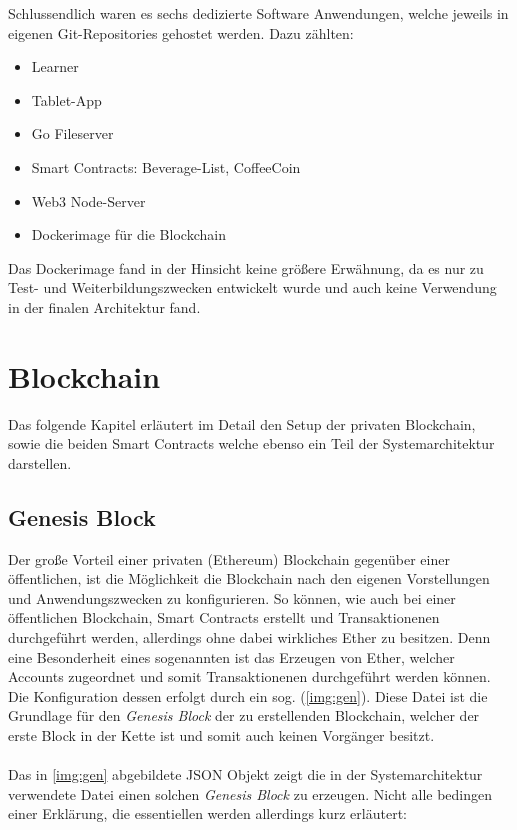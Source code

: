Schlussendlich waren es sechs dedizierte Software Anwendungen, welche jeweils in eigenen Git-Repositories gehostet werden.
Dazu zählten:
\begin{itemize}
	\item Learner
	\item Tablet-App
	\item Go Fileserver
	\item Smart Contracts: Beverage-List, CoffeeCoin
	\item Web3 Node-Server
	\item Dockerimage für die Blockchain
\end{itemize}
Das Dockerimage fand in der Hinsicht keine größere Erwähnung, da es nur zu Test- und Weiterbildungszwecken entwickelt wurde und auch keine Verwendung in der finalen Architektur fand.


\section{Blockchain}
\label{sec:bchain}

Das folgende Kapitel erläutert im Detail den Setup der privaten Blockchain, sowie die beiden Smart Contracts welche ebenso ein Teil der Systemarchitektur darstellen.\\

\subsection{Genesis Block}
\label{subsec:genesis}
Der große Vorteil einer privaten (Ethereum) Blockchain gegenüber einer öffentlichen, ist die Möglichkeit die Blockchain nach den eigenen Vorstellungen und Anwendungszwecken zu konfigurieren. So können, wie auch bei einer öffentlichen Blockchain, Smart Contracts erstellt und Transaktionenen durchgeführt werden, allerdings ohne dabei wirkliches Ether zu besitzen. Denn eine Besonderheit eines sogenannten  ist das Erzeugen von  Ether, welcher Accounts zugeordnet und somit Transaktionenen durchgeführt werden können.\\
Die Konfiguration dessen erfolgt durch ein sog.  (\ref{img:gen}). Diese Datei ist die Grundlage für den \textit{Genesis Block} der zu erstellenden Blockchain, welcher der erste Block in der Kette ist und somit auch keinen Vorgänger besitzt.\\\\
Das in \ref{img:gen} abgebildete JSON Objekt zeigt die in der Systemarchitektur verwendete Datei einen solchen \textit{Genesis Block} zu erzeugen. Nicht alle  bedingen einer Erklärung, die essentiellen werden allerdings kurz erläutert: 

